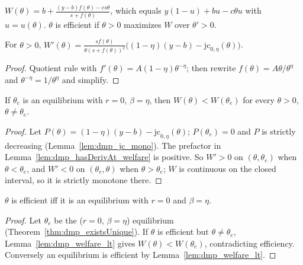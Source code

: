 \begin{definition}
\label{def:dmp_welfare}
\leanok
{}
$W(\theta) = b + \frac{(y - b) f(\theta) - c s \theta}{s + f(\theta)}$, which equals
$y(1 - u) + b u - c\theta u$ with $u = u(\theta)$. $\theta$ is efficient if $\theta > 0$ maximizes $W$ over $\theta' > 0$.
\end{definition}

\begin{lemma}
\label{lem:dmp_hasDerivAt_welfare}
\leanok
{}
For $\theta > 0$,
$W'(\theta) = \frac{s f(\theta)}{\theta (s + f(\theta))^2}\big((1-\eta)(y-b) - \mathrm{jc}_{0,\eta}(\theta)\big)$.
\end{lemma}
\begin{proof}
\leanok
Quotient rule with $f'(\theta) = A(1-\eta)\theta^{-\eta}$; then rewrite $f(\theta) = A\theta/\theta^\eta$ and
$\theta^{-\eta} = 1/\theta^\eta$ and simplify.
\end{proof}

\begin{lemma}[Welfare is uniquely maximized at the $r = 0$, $\beta = \eta$ equilibrium]
\label{lem:dmp_welfare_lt}
\leanok
{}
If $\theta_e$ is an equilibrium with $r = 0$, $\beta = \eta$, then $W(\theta) < W(\theta_e)$ for every $\theta > 0$, $\theta \neq \theta_e$.
\end{lemma}
\begin{proof}
\leanok
Let $P(\theta) = (1-\eta)(y-b) - \mathrm{jc}_{0,\eta}(\theta)$; $P(\theta_e) = 0$ and $P$ is strictly decreasing
(Lemma~\ref{lem:dmp_jc_mono}). The prefactor in Lemma~\ref{lem:dmp_hasDerivAt_welfare} is positive. So $W' > 0$ on
$(\theta, \theta_e)$ when $\theta < \theta_e$, and $W' < 0$ on $(\theta_e, \theta)$ when $\theta > \theta_e$; $W$ is
continuous on the closed interval, so it is strictly monotone there.
\end{proof}

\begin{theorem}
\label{thm:dmp_isEfficient_iff}
\leanok
{}
$\theta$ is efficient iff it is an equilibrium with $r = 0$ and $\beta = \eta$.
\end{theorem}
\begin{proof}
\leanok
Let $\theta_e$ be the ($r = 0$, $\beta = \eta$) equilibrium (Theorem~\ref{thm:dmp_existsUnique}). If $\theta$ is efficient but
$\theta \neq \theta_e$, Lemma~\ref{lem:dmp_welfare_lt} gives $W(\theta) < W(\theta_e)$, contradicting efficiency.
Conversely an equilibrium is efficient by Lemma~\ref{lem:dmp_welfare_lt}.
\end{proof}

